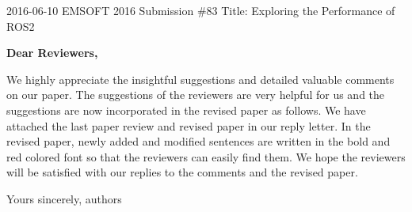 \documentclass{article}
\begin{document}
\begin{flushleft}
  2016-06-10\newline
  EMSOFT 2016 Submission \#83\newline
  Title: Exploring the Performance of ROS2\newline
\end{flushleft}
\textbf{Dear Reviewers,}\newline

We highly appreciate the insightful suggestions and detailed valuable comments on our paper. The suggestions of the reviewers are very helpful for us and the suggestions are now incorporated in the revised paper as follows. We have attached the last paper review and revised paper in our reply letter. In the revised paper, newly added and modified sentences are written in the bold and red colored font so that the reviewers can easily find them. We hope the reviewers will be satisfied with our replies to the comments and the revised paper.\newline\newline

\begin{flushleft}
  Yours sincerely,\newline
  authors
\end{flushleft}

\clearpage




\end{document}
